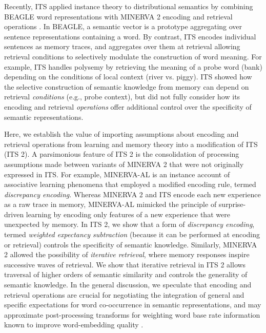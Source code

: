 \documentclass[10pt,letterpaper]{article}
\begin{document}
Recently, ITS \cite{jamiesonInstanceTheoryAssociative2012} applied instance theory to distributional semantics by combining BEAGLE word representations \cite{jonesRepresentingWordMeaning2007} with MINERVA 2 encoding and retrieval operations \cite{hintzmanMINERVASimulationModel1984}. In BEAGLE, a semantic vector is a prototype aggregating over sentence representations containing a word. By contrast, ITS encodes individual sentences as memory traces, and aggregates over them at retrieval allowing retrieval conditions to selectively modulate the construction of word meaning. For example, ITS handles polysemy by retrieving the meaning of a probe word (bank) depending on the conditions of local context (river vs. piggy). ITS showed how the selective construction of semantic knowledge from memory can depend on retrieval \emph{conditions} (e.g., probe context), but did not fully consider how its encoding and retrieval \emph{operations} offer additional control over the specificity of semantic representations.

Here, we establish the value of importing assumptions about encoding and retrieval operations from learning and memory theory into a modification of ITS (ITS 2). A parsimonious feature of ITS 2 is the consolidation of processing assumptions made between variants of MINERVA 2 that were not originally expressed in ITS. For example, MINERVA-AL \cite{jamiesonInstanceTheoryAssociative2012} is an instance account of associative learning phenomena that employed a modified encoding rule, termed \emph{discrepancy encoding}. Whereas MINERVA 2 and ITS encode each new experience as a raw trace in memory, MINERVA-AL mimicked the principle of surprise-driven learning \cite{rescorlaTheoryPavlovianConditioning1972} by encoding only features of a new experience that were unexpected by memory. In ITS 2, we show that a form of \emph{discrepancy encoding}, termed \emph{weighted expectancy subtraction} (because it can be performed at encoding or retrieval) controls the specificity of semantic knowledge. Similarly, MINERVA 2 allowed the possibility of \emph{iterative retrieval}, where memory responses inspire successive waves of retrieval. We show that iterative retrieval in ITS 2 allows traversal of higher orders of semantic similarity and controls the generality of semantic knowledge. In the general discussion, we speculate that encoding and retrieval operations are crucial for negotiating the integration of general and specific expectations for word co-occurrence in semantic representations, and may approximate post-processing transforms for weighting word base rate information known to improve word-embedding quality \cite{johnsRoleNegativeInformation2019}.
\end{document}
